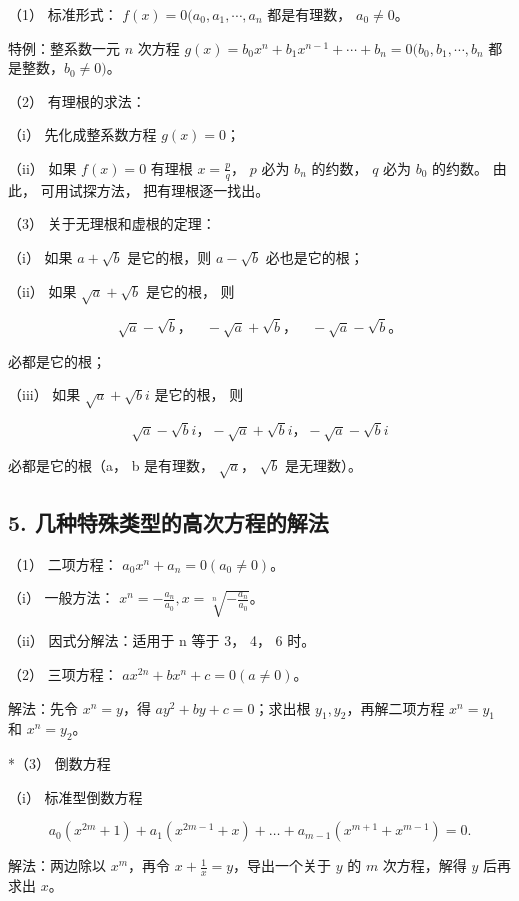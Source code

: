 （1） 标准形式： \(f(x) = 0 (a_0, a_1, \cdots, a_n\) 都是有理数，
\(a_0 \neq 0\)。

特例：整系数一元 \(n\) 次方程
\(g(x) = b_0x^n + b_1x^{n-1} + \cdots + b_n = 0 (b_0, b_1, \cdots, b_n\)
都是整数，\(b_0 \neq 0)\)。

（2） 有理根的求法：

（i） 先化成整系数方程 \(g(x) = 0\)；

（ii） 如果 \(f(x) = 0\) 有理根 \(x = \frac{p}{q}\)， \(p\) 必为 \(b_n\)
的约数， \(q\) 必为 \(b_0\) 的约数。 由此， 可用试探方法，
把有理根逐一找出。

（3） 关于无理根和虚根的定理：

（i） 如果 \(a+\sqrt b\) 是它的根，则 \(a-\sqrt b\) 必也是它的根；

（ii） 如果 \(\sqrt{a} + \sqrt{b}\) 是它的根， 则

\[
\sqrt a-\sqrt b\text{，}\quad-\sqrt a+\sqrt b\text{，}\quad-\sqrt a-\sqrt b\text{。}
\]

必都是它的根；

（iii） 如果 \(\sqrt{a} + \sqrt{b} i\) 是它的根， 则

\[
\sqrt {a} - \sqrt {b} i\text{，} - \sqrt {a} + \sqrt {b} i\text{，} - \sqrt {a} - \sqrt {b} i
\]

必都是它的根（a， b 是有理数， \(\sqrt{a}\)， \(\sqrt{b}\) 是无理数）。

\subsection{5. 几种特殊类型的高次方程的解法}

（1） 二项方程： \(a_{0}x^{n} + a_{n} = 0 (a_{0} \neq 0)\)。

（i） 一般方法：
\(x^{n} = -\frac{a_{n}}{a_{0}}, x = \sqrt[n]{-\frac{a_{n}}{a_{0}}}\)。

（ii） 因式分解法：适用于 n 等于 3， 4， 6 时。

（2） 三项方程： \(ax^{2n} + bx^n + c = 0 (a \neq 0)\)。

解法：先令 \(x^n = y\)，得 \(ay^2 + by + c = 0\)；求出根
\(y_1, y_2\)，再解二项方程 \(x^n = y_1\) 和 \(x^n = y_2\)。

*（3） 倒数方程

（i） 标准型倒数方程

\[
a _ {0} \left(x ^ {2 m} + 1\right) + a _ {1} \left(x ^ {2 m - 1} + x\right) + \dots + a _ {m - 1} \left(x ^ {m + 1} + x ^ {m - 1}\right) = 0.
\]

解法：两边除以 \(x^{m}\)，再令 \(x + \frac{1}{x} = y\)，导出一个关于
\(y\) 的 \(m\) 次方程，解得 \(y\) 后再求出 \(x\)。


